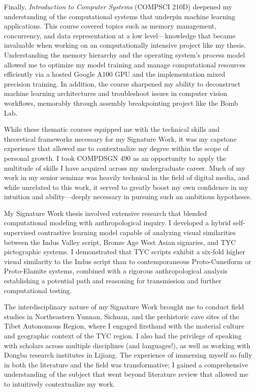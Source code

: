 \documentclass[11pt,a4paper,oneside]{report}
\begin{document}
Finally, \textit{Introduction to Computer Systems} (COMPSCI 210D) deepened my understanding of the computational systems that underpin machine learning applications. This course covered topics such as memory management, concurrency, and data representation at a low level—knowledge that became invaluable when working on an computationally intensive project like my thesis. Understanding the memory hierarchy and the operating system's process model allowed me to optimize my model training and manage computational resources efficiently via a hosted Google A100 GPU and the implementation mixed precision training. In addition, the course sharpened my ability to deconstruct machine learning architectures and troubleshoot issues in computer vision workflows, memorably through assembly breakpointing project like the Bomb Lab.

While these thematic courses equipped me with the technical skills and theoretical frameworks necessary for my Signature Work, it was my capstone experience that allowed me to contextualize my degree within the scope of personal growth. I took COMPDSGN 490 as an opportunity to apply the multitude of skills I have acquired across my undergraduate career. Much of my work in my senior seminar was heavily technical in the field of digital media, and while unrelated to this work, it served to greatly boost my own confidence in my intuition and ability—deeply necessary in pursuing such an ambitious hypotheses. 

My Signature Work thesis involved extensive research that blended computational modeling with anthropological inquiry. I developed a hybrid self-supervised contrastive learning model capable of analyzing visual similarities between the Indus Valley script, Bronze Age West Asian signaries, and TYC pictographic systems. I demonstrated that TYC scripts exhibit a six-fold higher visual similarity to the Indus script than to contemporaneous Proto-Cuneiform or Proto-Elamite systems, combined with a rigorous anthropological analysis establishing a potential path and reasoning for transmission and further computational testing.

The interdisciplinary nature of my Signature Work brought me to conduct field studies in Northeastern Yunnan, Sichuan, and the prehistoric cave sites of the Tibet Autonomous Region, where I engaged firsthand with the material culture and geographic context of the TYC region. I also had the privilege of speaking with scholars across multiple disciplines (and languages!), as well as working with Dongba research institutes in Lijiang. The experience of immersing myself so fully in both the literature and the field was transformative; I gained a comprehensive understanding of the subject that went beyond literature review that allowed me to intuitively contextualize my work.
\end{document}
